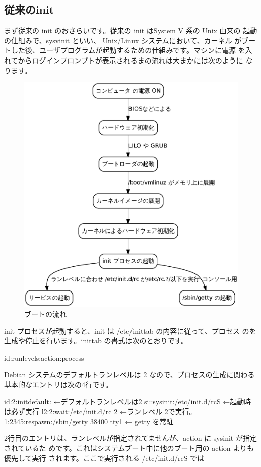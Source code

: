 \documentclass[mingoth,a4paper]{jsarticle}
\begin{document}
\subsection{従来のinit}

まず従来の init のおさらいです。従来の init はSystem V 系の Unix 由来の
起動の仕組みで、sysvinit といい、 Unix/Linux システムにおいて、カーネル
がブートした後、ユーザプログラムが起動するための仕組みです。マシンに電源
を入れてからログインプロンプトが表示されるまの流れは大まかには次のように
なります。

\begin{figure}[H]
\caption{ブートの流れ}
\begin{center}
\includegraphics[height=0.5\hsize]{image201002/sysvinit.eps}
\end{center}
\end{figure}

init プロセスが起動すると、init は /etc/inittab の内容に従って、プロセス
のを生成や停止を行います。inittab の書式は次のとおりです。

\begin{commandline}
id:runlevels:action:process
\end{commandline}

Debian システムのデフォルトランレベルは 2 なので、プロセスの生成に関わる
基本的なエントリは次の4行です。

\begin{commandline}
id:2:initdefault:                     ←デフォルトランレベルは2
si::sysinit:/etc/init.d/rcS           ←起動時は必ず実行
l2:2:wait:/etc/init.d/rc 2            ←ランレベル 2で実行。
1:2345:respawn:/sbin/getty 38400 tty1 ← getty を常駐
\end{commandline}

2行目のエントリは、ランレベルが指定されてませんが、action に sysinit が指定されているた
めです。これはシステムブート中に他のブート用の action よりも優先して実行
されます。ここで実行される /etc/init.d/rcS では
\end{document}
